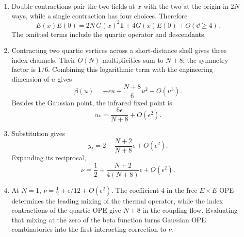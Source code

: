 \begin{enumerate}
  \begin{enumerate}
    \item[(a)]
    Double contractions pair the two fields at \(x\) with the two at the
    origin in \(2N\) ways, while a single contraction has four choices.
    Therefore
    \[
      \boxed{E(x)E(0)
        =2N\,G(x)^2\mathbf{1}+4G(x)E(0)+O(\dd\geq4).}
    \]
    The omitted terms include the quartic operator and descendants.
    \item[(b)]
    Contracting two quartic vertices across a short-distance shell gives
    three index channels.  Their \(O(N)\) multiplicities sum to \(N+8\);
    the symmetry factor is \(1/6\).  Combining this logarithmic term with
    the engineering dimension of \(u\) gives
    \[
      \beta(u)=-\epsilon u+\frac{N+8}{6}u^2+O(u^3).
    \]
    Besides the Gaussian point, the infrared fixed point is
    \[
      \boxed{u_*=\frac{6\epsilon}{N+8}+O(\epsilon^2).}
    \]
    \item[(c)]
    Substitution gives
    \[
      y_t=2-\frac{N+2}{N+8}\epsilon+O(\epsilon^2).
    \]
    Expanding its reciprocal,
    \[
      \boxed{\nu=\frac12+
        \frac{N+2}{4(N+8)}\epsilon+O(\epsilon^2).}
    \]
    \item[(d)]
    At \(N=1\),
    \(\nu=\tfrac12+\epsilon/12+O(\epsilon^2)\).
    The coefficient \(4\) in the free \(E\times E\) OPE determines the
    leading mixing of the thermal operator, while the index contractions
    of the quartic OPE give \(N+8\) in the coupling flow.  Evaluating that
    mixing at the zero of the beta function turns Gaussian OPE
    combinatorics into the first interacting correction to \(\nu\).
  \end{enumerate}


\end{enumerate}
